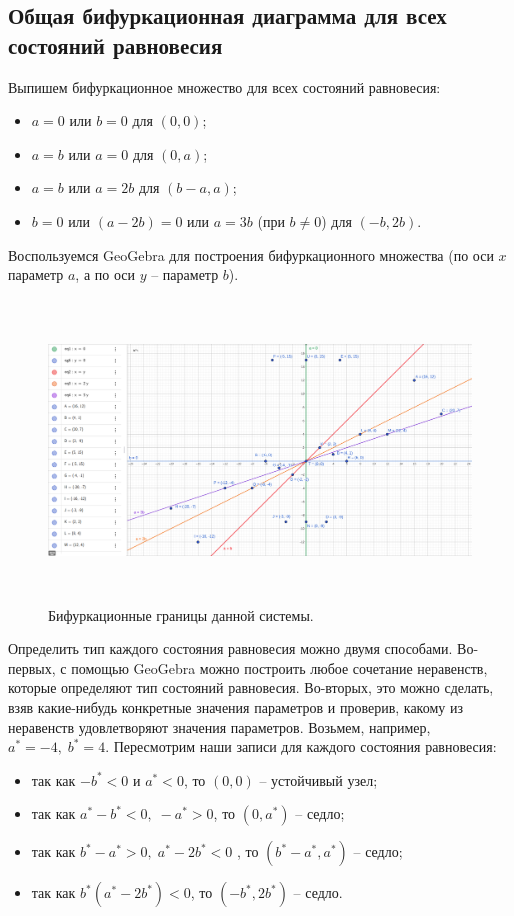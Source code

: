 \subsection{Общая бифуркационная диаграмма для всех состояний равновесия}
Выпишем бифуркационное множество для всех состояний равновесия: 
\begin{itemize}
\item{$a = 0$ или $ b = 0$ для $(0, 0)$;}
\item{$a = b$ или $ a = 0$ для $(0, a)$;}
\item{$a = b$ или $ a = 2b$ для $\left (b-a , a \right )$;}
\item{$b = 0$ или $(a-2b)=0$ или $a = 3b $ (при $b \ne 0 $)  для $ \left ( -b, 2b  \right ) $.}
\end{itemize}
Воспользуемся GeoGebra для построения бифуркационного множества (по оси $x$ параметр $a$, а по оси $y$ -- параметр $b$).
\begin{figure}[!thb]
\includegraphics[height=8cm]{Bifdiag.png}
\centering
\caption{\label{fig:bifdiag2} Бифуркационные границы данной системы.}
\end{figure}
Определить тип каждого состояния равновесия можно двумя способами.
Во-первых, с помощью GeoGebra можно построить любое сочетание неравенств, которые определяют тип состояний равновесия.
Во-вторых, это можно сделать, взяв какие-нибудь конкретные значения параметров и проверив, какому из неравенств удовлетворяют значения параметров. 
Возьмем, например, $a^\ast = -4,\; b^\ast = 4$. 
Пересмотрим наши записи для каждого состояния равновесия: 
\begin{itemize}
\item{так как $-b^\ast < 0$ и $a^\ast < 0$, то $(0, 0)$ -- устойчивый узел;}
\item{так как $a^\ast -b^\ast < 0, \; -a^\ast > 0$, то $(0, a^\ast)$ -- седло; }
\item{так как $b^\ast-a^\ast > 0, \; a^\ast - 2b^\ast < 0$ , то $\left ( b^\ast-a^\ast , a^\ast \right )$ -- седло;}
\item{так как $b^\ast(a^\ast - 2 b^\ast) < 0$, то $  ( -b^\ast, 2b^\ast ) $ -- седло.}
\end{itemize}
